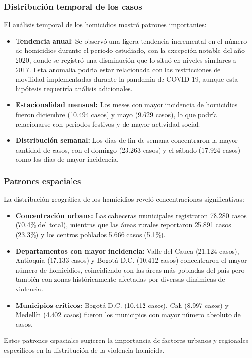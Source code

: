\documentclass[lettersize,journal]{IEEEtran}
\begin{document}
\subsubsection{Distribución temporal de los casos}
El análisis temporal de los homicidios mostró patrones importantes:
\begin{itemize}
\item \textbf{Tendencia anual:} Se observó una ligera tendencia incremental en el número de homicidios durante el periodo estudiado, con la excepción notable del año 2020, donde se registró una disminución que lo situó en niveles similares a 2017. Esta anomalía podría estar relacionada con las restricciones de movilidad implementadas durante la pandemia de COVID-19, aunque esta hipótesis requeriría análisis adicionales.
\item \textbf{Estacionalidad mensual:} Los meses con mayor incidencia de homicidios fueron diciembre (10.494 casos) y mayo (9.629 casos), lo que podría relacionarse con periodos festivos y de mayor actividad social.
\item \textbf{Distribución semanal:} Los días de fin de semana concentraron la mayor cantidad de casos, con el domingo (23.263 casos) y el sábado (17.924 casos) como los días de mayor incidencia.
\end{itemize}
\subsubsection{Patrones espaciales}
La distribución geográfica de los homicidios reveló concentraciones significativas:
\begin{itemize}
\item \textbf{Concentración urbana:} Las cabeceras municipales registraron 78.280 casos (70.4\% del total), mientras que las áreas rurales reportaron 25.891 casos (23.3\%) y los centros poblados 5.666 casos (5.1\%).
\item \textbf{Departamentos con mayor incidencia:} Valle del Cauca (21.124 casos), Antioquia (17.133 casos) y Bogotá D.C. (10.412 casos) concentraron el mayor número de homicidios, coincidiendo con las áreas más pobladas del país pero también con zonas históricamente afectadas por diversas dinámicas de violencia.
\item \textbf{Municipios críticos:} Bogotá D.C. (10.412 casos), Cali (8.997 casos) y Medellín (4.402 casos) fueron los municipios con mayor número absoluto de casos.
\end{itemize}
Estos patrones espaciales sugieren la importancia de factores urbanos y regionales específicos en la distribución de la violencia homicida.
\end{document}
